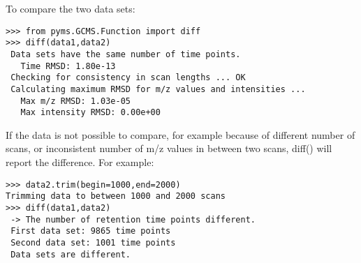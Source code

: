 To compare the two data sets:

\begin{verbatim}
>>> from pyms.GCMS.Function import diff
>>> diff(data1,data2)
 Data sets have the same number of time points.
   Time RMSD: 1.80e-13
 Checking for consistency in scan lengths ... OK
 Calculating maximum RMSD for m/z values and intensities ...
   Max m/z RMSD: 1.03e-05
   Max intensity RMSD: 0.00e+00
\end{verbatim}

If the data is not possible to compare, for example because of
different number of scans, or inconsistent number of m/z values
in between two scans, diff() will report the difference.
For example:

\begin{verbatim}
>>> data2.trim(begin=1000,end=2000)
Trimming data to between 1000 and 2000 scans
>>> diff(data1,data2)
 -> The number of retention time points different.
 First data set: 9865 time points
 Second data set: 1001 time points
 Data sets are different.
\end{verbatim}

